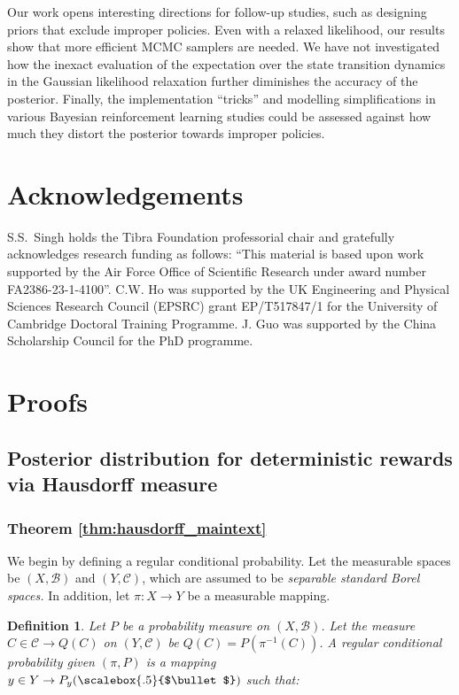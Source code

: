 \documentclass{amsart}
\newtheorem{definition}{Definition}
\renewcommand{\cdot}[1][.5]{%
  \mathbin{\vcenter{\hbox{\scalebox{#1}{$\bullet$}}}}%
}
\begin{document}
Our work opens interesting directions for follow-up studies, such as designing priors that exclude improper policies. Even with a relaxed likelihood, our results show that more efficient MCMC samplers are needed. We have not investigated how the inexact evaluation of the expectation over the state transition dynamics in the Gaussian likelihood relaxation further diminishes the accuracy of the posterior. Finally, the implementation ``tricks'' and modelling simplifications in various Bayesian reinforcement learning studies could be assessed against how much they distort the posterior towards improper policies.



\section*{Acknowledgements}
S.S.~Singh holds the Tibra Foundation professorial chair and gratefully acknowledges research funding as follows: ``This material is based upon work supported by the Air Force Office of Scientific Research under award number FA2386-23-1-4100''. C.W. Ho was supported by the UK Engineering and Physical Sciences Research Council (EPSRC) grant EP/T517847/1 for the University of Cambridge Doctoral Training Programme. J. Guo was supported by the China Scholarship Council for the PhD programme.




  \appendix

\section{Proofs}

\subsection{Posterior distribution for deterministic rewards via Hausdorff measure}\label{apd:hausdorff_proof}

\subsubsection{Theorem \ref{thm:hausdorff_maintext}}\label{apd:hausdorffmaintexthmproof}

We begin by defining a regular conditional probability. Let the measurable spaces be $(X,\mathcal{B})$ and $(Y,\mathcal{C})$,
which are assumed to be \emph{separable standard Borel spaces.} In addition, let $\pi:X\rightarrow  Y$
be a measurable mapping.
\begin{definition}\label{def:rcp}\citep{rcp_def_parthasarathy}
Let $P$ be a probability measure on $(X,\mathcal{B})$. Let the
measure $C\in\mathcal{C}\rightarrow Q(C)$ on $(Y,\mathcal{C})$ be
$Q(C)=P(\pi^{-1}(C))$. A \emph{regular conditional probability given
$(\pi,P)$} is a mapping $y\in Y\rightarrow P_{y}(\cdot)$ such
that:
\end{definition}
\end{document}
